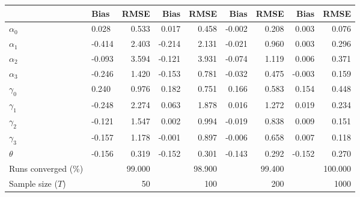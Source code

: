 
\begin{tabular}[t]{llrrrrrrr}
\toprule
  & Bias & RMSE & Bias & RMSE & Bias & RMSE & Bias & RMSE\\
\midrule
$\alpha_{0}$ & 0.028 & 0.533 & 0.017 & 0.458 & -0.002 & 0.208 & 0.003 & 0.076\\
$\alpha_{1}$ & -0.414 & 2.403 & -0.214 & 2.131 & -0.021 & 0.960 & 0.003 & 0.296\\
$\alpha_{2}$ & -0.093 & 3.594 & -0.121 & 3.931 & -0.074 & 1.119 & 0.006 & 0.371\\
$\alpha_{3}$ & -0.246 & 1.420 & -0.153 & 0.781 & -0.032 & 0.475 & -0.003 & 0.159\\
$\gamma_{0}$ & 0.240 & 0.976 & 0.182 & 0.751 & 0.166 & 0.583 & 0.154 & 0.448\\
$\gamma_{1}$ & -0.248 & 2.274 & 0.063 & 1.878 & 0.016 & 1.272 & 0.019 & 0.234\\
$\gamma_{2}$ & -0.121 & 1.547 & 0.002 & 0.994 & -0.019 & 0.838 & 0.009 & 0.151\\
$\gamma_{3}$ & -0.157 & 1.178 & -0.001 & 0.897 & -0.006 & 0.658 & 0.007 & 0.118\\
$\theta$ & -0.156 & 0.319 & -0.152 & 0.301 & -0.143 & 0.292 & -0.152 & 0.270\\
Runs converged (\%) &  & 99.000 &  & 98.900 &  & 99.400 &  & 100.000\\
Sample size ($T$) &  & 50 &  & 100 &  & 200 &  & 1000\\
\bottomrule
\end{tabular}

